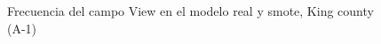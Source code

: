 \begin{figure}[H]
    \centering
    
    \caption{Frecuencia del campo View en el modelo real y smote, King county (A-1)}
    \label{frecuency-smote-view}
\end{figure}